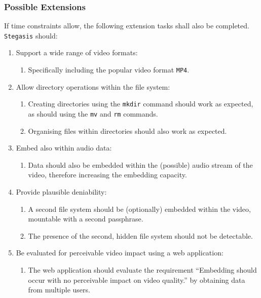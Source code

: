 \documentclass[paper=a4, fontsize=11pt,twoside]{scrartcl}    %
\numberwithin{table}{section}
\numberwithin{figure}{section}
\numberwithin{algorithm}{section}
\begin{document}
\subsubsection{Possible Extensions}

If time constraints allow, the following extension tasks shall also be completed.\\

\noindent
\texttt{Stegasis} should:

\begin{enumerate}
\item Support a wide range of video formats:
	\begin{enumerate}
		\item Specifically including the popular video format \texttt{MP4}.		
	\end{enumerate}
\item Allow directory operations within the file system:
	\begin{enumerate}
		\item Creating directories using the \texttt{mkdir} command should work as expected, as should using the \texttt{mv} and \texttt{rm} commands.
		\item Organising files within directories should also work as expected.
	\end{enumerate}	
\item Embed also within audio data:
	\begin{enumerate}
		\item Data should also be embedded within the (possible) audio stream of the video, therefore increasing the embedding capacity.
	\end{enumerate}	
\item Provide plausible deniability:
	\begin{enumerate}
		\item A second file system should be (optionally) embedded within the video, mountable with a second passphrase.
		\item The presence of the second, hidden file system should not be detectable.
	\end{enumerate}
\item Be evaluated for perceivable video impact using a web application:
	\begin{enumerate}
		\item The web application should evaluate the requirement ``Embedding should occur with no perceivable impact on video quality.'' by obtaining data from multiple users.
	\end{enumerate}		
\end{enumerate}
\end{document}
